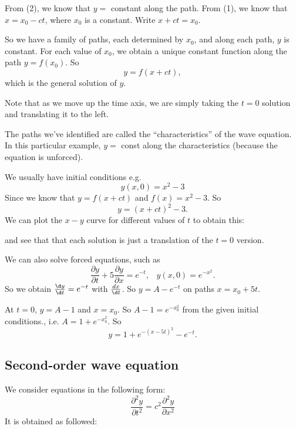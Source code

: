 \documentclass[a4paper]{article}
\begin{document}
From (2), we know that $y = $ constant along the path. From (1), we know that $x = x_0 - ct$, where $x_0$ is a constant. Write $x + ct = x_0$.

So we have a family of paths, each determined by $x_0$, and along each path, $y$ is constant. For each value of $x_0$, we obtain a unique constant function along the path $y = f(x_0)$. So
\[
y = f(x + ct),
\]
which is the general solution of $y$.

\begin{center}
\end{center}

Note that as we move up the time axis, we are simply taking the $t = 0$ solution and translating it to the left.

The paths we've identified are called the ``characteristics'' of the wave equation. In this particular example, $y =$ const along the characteristics (because the equation is unforced).

We usually have initial conditions e.g.
\[
y(x, 0) = x^2 - 3
\]
Since we know that $y = f(x + ct)$ and $f(x) = x^2 - 3$. So
\[
y = (x + ct)^2 - 3.
\]
We can plot the $x-y$ curve for different values of $t$ to obtain this:


and see that that each solution is just a translation of the $t = 0$ version.

We can also solve forced equations, such as
\[
\frac{\partial y}{\partial t} + 5\frac{\partial y}{\partial x} = e^{-t},\;\;\; y(x, 0) = e^{-x^2}.
\]
So we obtain $\frac{\d y}{\d t} = e^{-t}$ with $\frac{d x}{\d t}$. So $y = A - e^{-t}$ on paths $x = x_0 + 5t$.

At $t = 0$, $y = A - 1$ and $x = x_0$. So $A - 1 = e^{-x_0^2}$ from the given initial conditions., i.e. $A = 1 + e^{-x_0^2}$. So
\[
y = 1 + e^{-(x - 5t)^2} - e^{-t}.
\]
\subsection{Second-order wave equation}
We consider equations in the following form:
\[
\frac{\partial ^2 y}{\partial t^2} = c^2 \frac{\partial^2 y}{\partial x^2}
\]
It is obtained as followed:
\end{document}
